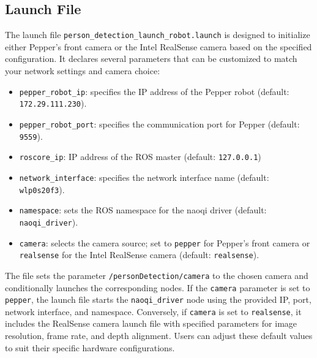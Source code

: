 \documentclass{CSSRforAfrica}
\begin{document}
\subsection*{Launch File}
The launch file \texttt{person\_detection\_launch\_robot.launch} is designed to initialize either Pepper's front camera or the Intel RealSense camera based on the specified configuration. It declares several parameters that can be customized to match your network settings and camera choice:
\begin{itemize}
	\setlength\itemsep{0em}
	\item \texttt{pepper\_robot\_ip}: specifies the IP address of the Pepper robot (default: \texttt{172.29.111.230}).
	\item \texttt{pepper\_robot\_port}: specifies the communication port for Pepper (default: \texttt{9559}).
	\item \texttt{roscore\_ip}: IP address of the ROS master (default: \texttt{127.0.0.1})
	\item \texttt{network\_interface}: specifies the network interface name (default: \texttt{wlp0s20f3}).
	\item \texttt{namespace}: sets the ROS namespace for the naoqi driver (default: \texttt{naoqi\_driver}).
	\item \texttt{camera}: selects the camera source; set to \texttt{pepper} for Pepper's front camera or \texttt{realsense} for the Intel RealSense camera (default: \texttt{realsense}).
\end{itemize}

The file sets the parameter \texttt{/personDetection/camera} to the chosen camera and conditionally launches the corresponding nodes. If the \texttt{camera} parameter is set to \texttt{pepper}, the launch file starts the \texttt{naoqi\_driver} node using the provided IP, port, network interface, and namespace. Conversely, if \texttt{camera} is set to \texttt{realsense}, it includes the RealSense camera launch file with specified parameters for image resolution, frame rate, and depth alignment. Users can adjust these default values to suit their specific hardware configurations.
\end{document}
